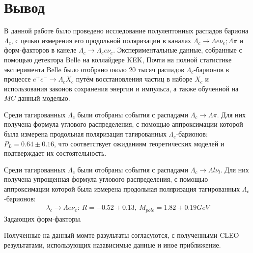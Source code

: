 \section{Вывод}

В данной работе было проведено исследование полулептонных распадов бариона $\Lambda_c$, 
с целью измерения его продольной поляризации в каналах $\Lambda_c \to \Lambda e \nu_e; \Lambda \pi$ 
и форм-факторов в канеле $\Lambda_c \to \Lambda_c e \nu_e$. 
Экспериментальные данные, собранные с помощью детектора Belle на коллайдере KEK, 
Почти на полной статистике эксперимента Belle было отобрано около
$20$ тысяч распадов $\Lambda_c$-барионов в процессе $e^+ e^- \to \Lambda_c X_c$ путём 
восстановления частиц в наборе $X_c$ и использования законов сохранения
энергии и импульса, а также обученной на $MC$ данный моделью.

Среди тагированных $\Lambda_c$ были отобраны события с распадами $\Lambda_c \to \Lambda \pi$. 
Для них получена формула углового распределения, с помощью аппроксимации которой была измерена
продольная поляризация тагированных $\Lambda_c$-барионов: $ P_L = 0.64\pm 0.16$,
что соответствует ожиданиям теоретических моделей и подтверждает их состоятельность.

Среди тагированных $\Lambda_c$ были отобраны события с распадами $\Lambda_c \to \Lambda l \nu_l$.
Для них получена упрощенная формула углового распределения, с помощью аппроксимации которой была измерена
продольная поляризация тагированных $\Lambda_c$-барионов:
\begin{eqnarray}
    \lambda_c \to \Lambda e \nu_e: \ R = -0.52 \pm 0.13,\ M_{pole} = 1.82 ± 0.19 GeV
\end{eqnarray}
Задающих форм-факторы. 

Полученные на данный момте разультаты согласуются, с полученными CLEO результатами, использующих 
назависимые данные и иное приближение.